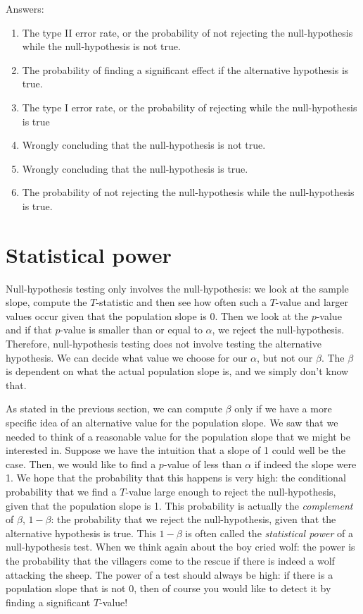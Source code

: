 \documentclass[]{report}\usepackage[]{graphicx}\usepackage[]{color}
\begin{document}
Answers:

\begin{enumerate}

\item The type II error rate, or the probability of not rejecting the null-hypothesis while the null-hypothesis is not true.

\item The probability of finding a significant effect if the alternative hypothesis is true.

\item The type I error rate, or the probability of rejecting while the null-hypothesis is true

\item Wrongly concluding that the null-hypothesis is not true.

\item Wrongly concluding that the null-hypothesis is true.

\item The probability of not rejecting the null-hypothesis while the null-hypothesis is true.


\end{enumerate}


\section{Statistical power}

Null-hypothesis testing only involves the null-hypothesis: we look at the sample slope, compute the $T$-statistic and then see how often such a $T$-value and larger values occur given that the population slope is 0. Then we look at the $p$-value and if that $p$-value is smaller than or equal to $\alpha$, we reject the null-hypothesis. Therefore, null-hypothesis testing does not involve testing the alternative hypothesis. We can decide what value we choose for our $\alpha$, but not our $\beta$. The $\beta$ is dependent on what the actual population slope is, and we simply don't know that.

As stated in the previous section, we can compute $\beta$ only if we have a more specific idea of an alternative value for the population slope. We saw that we needed to think of a reasonable value for the population slope that we might be interested in. Suppose we have the intuition that a slope of 1 could well be the case. Then, we would like to find a $p$-value of less than $\alpha$ if indeed the slope were 1. We hope that the probability that this happens is very high: the conditional probability that we find a $T$-value large enough to reject the null-hypothesis, given that the population slope is 1. This probability is actually the \textit{complement} of $\beta$, $1-\beta$: the probability that we reject the null-hypothesis, given that the alternative hypothesis is true. This $1-\beta$ is often called the \textit{statistical power} of a null-hypothesis test. When we think again about the boy cried wolf: the power is the probability that the villagers come to the rescue if there is indeed a wolf attacking the sheep. The power of a test should always be high: if there is a population slope that is not 0, then of course you would like to detect it by finding a significant $T$-value!
\end{document}
